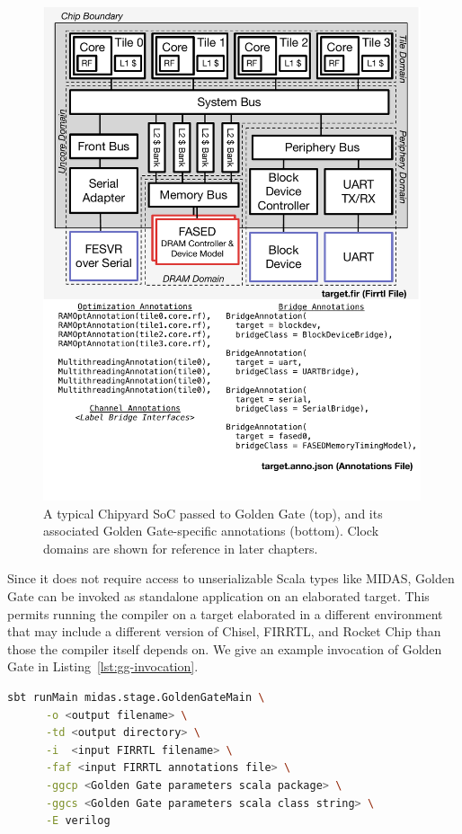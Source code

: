 \begin{figure}
    \centering
    \includegraphics[width=0.99\textwidth]{figures/gg-target.pdf}
    \caption{A typical Chipyard SoC passed to Golden Gate (top), and its associated Golden Gate-specific
    annotations (bottom). Clock domains are shown for reference in later chapters.}
    \label{fig:gg-target}
\end{figure}

Since it does not require access to unserializable Scala
types like MIDAS, Golden Gate can be invoked as standalone application on an
elaborated target. This permits running the
compiler on a target elaborated in a different environment that may include a
different version of Chisel, FIRRTL, and Rocket Chip than those the compiler
itself depends on. We give an example invocation of Golden Gate in Listing~\ref{lst:gg-invocation}.

\begin{lstlisting}[style=shell, language=bash, label={lst:gg-invocation}, caption=An example command-line invocation of Golden Gate.]
  sbt runMain midas.stage.GoldenGateMain \
      -o <output filename> \
      -td <output directory> \
      -i  <input FIRRTL filename> \
      -faf <input FIRRTL annotations file> \
      -ggcp <Golden Gate parameters scala package> \
      -ggcs <Golden Gate parameters scala class string> \
      -E verilog
\end{lstlisting}

